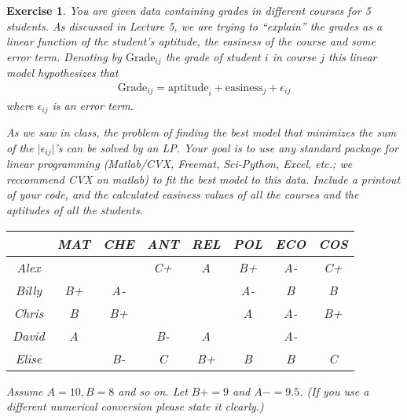 \documentclass[12pt]{article}
\theoremstyle{colon}
\newtheorem{exercise}{Exercise}
\begin{document}
\begin{exercise}
  You are given data containing grades in different courses for 5 students. As discussed in Lecture 5, we are trying to ``explain'' the grades as a linear function of the student's aptitude, the easiness of the course and some error term. Denoting by $\text{Grade}_{ij}$ the grade of student $i$ in course $j$ this linear model hypothesizes that
  \begin{gather*}
    \text{Grade}_{ij} = \text{aptitude}_i + \text{easiness}_j + \epsilon_{ij}
  \end{gather*}
  where $\epsilon_{ij}$ is an error term.

  As we saw in class, the problem of finding the best model that minimizes the sum of the $\lvert \epsilon_{ij} \rvert$'s can be solved by an LP. Your goal is to use any standard package for linear programming (Matlab/CVX, Freemat, Sci-Python, Excel, etc.; we reccommend CVX on matlab) to fit the best model to this data. Include a printout of your code, and the calculated easiness values of all the courses and the aptitudes of all the students.
  \begin{center}
    \begin{tabular}{c | c c c c c c c}
      & MAT & CHE & ANT & REL & POL & ECO & COS \\
      \hline
      Alex & & & C+ & A & B+ & A- & C+ \\
      Billy & B+ & A- & & & A- & B & B \\
      Chris & B & B+ & & & A & A- & B+ \\
      David & A & & B- & A & & A- & \\
      Elise & & B- & C & B+ & B & B & C
    \end{tabular}
  \end{center}
  Assume $A = 10, B = 8$ and so on. Let $B+ = 9$ and $A- = 9.5$. (If you use a different numerical conversion please state it clearly.)
\end{exercise}
\end{document}
